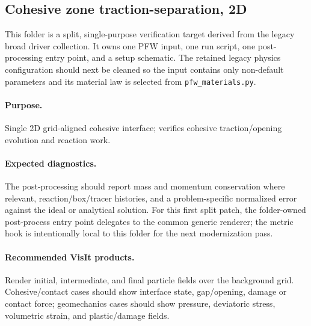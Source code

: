 \subsection{Cohesive zone traction-separation, 2D}
\label{sec:cohesiveZoneTraction2D}

This folder is a split, single-purpose verification target derived from the
legacy broad driver collection.  It owns one PFW input, one run script, one
post-processing entry point, and a setup schematic.  The retained legacy physics
configuration should next be cleaned so the input contains only non-default
parameters and its material law is selected from \texttt{pfw\_materials.py}.

\paragraph{Purpose.} Single 2D grid-aligned cohesive interface; verifies cohesive traction/opening evolution and reaction work.

\paragraph{Expected diagnostics.} The post-processing should report mass and
momentum conservation where relevant, reaction/box/tracer histories, and a
problem-specific normalized error against the ideal or analytical solution.  For
this first split patch, the folder-owned post-process entry point delegates to
the common generic renderer; the metric hook is intentionally local to this
folder for the next modernization pass.

\paragraph{Recommended VisIt products.} Render initial, intermediate, and final
particle fields over the background grid.  Cohesive/contact cases should show
interface state, gap/opening, damage or contact force; geomechanics cases should
show pressure, deviatoric stress, volumetric strain, and plastic/damage fields.
